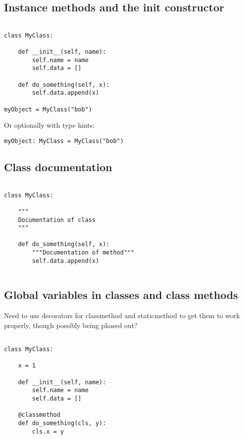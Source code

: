 
\subsection{Instance methods and the init constructor}

\begin{verbatim}

class MyClass:

    def __init__(self, name):
        self.name = name
        self.data = []

    def do_something(self, x):
        self.data.append(x)

myObject = MyClass("bob")

\end{verbatim}

Or optionally with type hints:

\begin{verbatim}
myObject: MyClass = MyClass("bob")

\end{verbatim}

\subsection{Class documentation}

\begin{verbatim}

class MyClass:

    """
    Documentation of class
    """

    def do_something(self, x):
        """Documentation of method"""
        self.data.append(x)
        
\end{verbatim}

\subsection{Global variables in classes and class methods}

Need to use decorators for classmethod and staticmethod to get them to work properly, though possibly being phased out?

\begin{verbatim}

class MyClass:

    x = 1

    def __init__(self, name):
        self.name = name
        self.data = []
    
    @classmethod
    def do_something(cls, y):
        cls.x = y
        
\end{verbatim}


